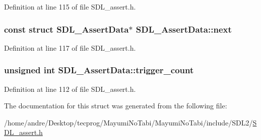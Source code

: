 Definition at line 115 of file S\-D\-L\-\_\-assert.\-h.

\hypertarget{struct_s_d_l___assert_data_a2081dcf06dce4df497e423bccddfc099}{
\subsubsection[{next}]{\setlength{\rightskip}{0pt plus 5cm}const struct {\bf S\-D\-L\-\_\-\-Assert\-Data}$\ast$ S\-D\-L\-\_\-\-Assert\-Data\-::next}}\label{struct_s_d_l___assert_data_a2081dcf06dce4df497e423bccddfc099}


Definition at line 117 of file S\-D\-L\-\_\-assert.\-h.

\hypertarget{struct_s_d_l___assert_data_a230bbcc2d115aab04cf817773e08eb5b}{
\subsubsection[{trigger\-\_\-count}]{\setlength{\rightskip}{0pt plus 5cm}unsigned {\bf int} S\-D\-L\-\_\-\-Assert\-Data\-::trigger\-\_\-count}}\label{struct_s_d_l___assert_data_a230bbcc2d115aab04cf817773e08eb5b}


Definition at line 112 of file S\-D\-L\-\_\-assert.\-h.



The documentation for this struct was generated from the following file\-:\begin{DoxyCompactItemize}
\item 
/home/andre/\-Desktop/tecprog/\-Mayumi\-No\-Tabi/\-Mayumi\-No\-Tabi/include/\-S\-D\-L2/\hyperlink{_s_d_l__assert_8h}{S\-D\-L\-\_\-assert.\-h}\end{DoxyCompactItemize}
